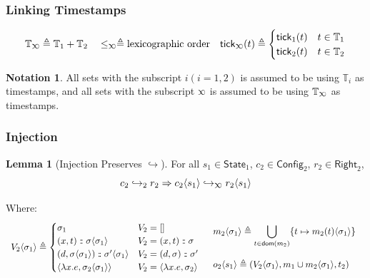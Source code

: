 \documentclass{beamer}
\theoremstyle{definition}
\newtheorem*{lemma*}{Lemma}
\newtheorem*{notation*}{Notation}
\newcommand*{\cons}{:{\hspace{-0.7em}}:}
\newcommand*{\modid}{d}
\newcommand*{\Time}{\mathbb{T}}
\newcommand*{\ctx}{\sigma}
\newcommand*{\mem}{m}
\newcommand*{\Config}{\mathsf{Config}}
\newcommand*{\config}{c}
\newcommand*{\Right}{\mathsf{Right}}
\newcommand*{\rightst}{r}
\newcommand*{\State}{\mathsf{State}}
\newcommand*{\semarrow}{\hookrightarrow}
\newcommand*{\semlink}{\mathbin{\rotatebox[origin=c]{180}{$\propto$}}}
\newcommand*{\tick}{\mathsf{tick}}
\newcommand*{\inject}[2]{{#2}\langle{#1}\rangle}
\begin{document}
\begin{frame}[c]
  \frametitle{Linking Timestamps}
  \[
    \Time_{\semlink}\triangleq\Time_1+\Time_2\quad
    \le_{\semlink}\triangleq\text{lexicographic order}\quad
    \tick_{\semlink}(t)\triangleq
    \begin{cases}
      \tick_1(t) & t\in\Time_1 \\
      \tick_2(t) & t\in\Time_2
    \end{cases}
  \]

  \begin{notation*}
    All sets with the subscript $i(i=1,2)$ is assumed to be using $\Time_i$ as timestamps, and all sets with the subscript $\semlink$ is assumed to be using $\Time_{\semlink}$ as timestamps.
  \end{notation*}
\end{frame}
\begin{frame}[c]
  \frametitle{Injection}
  \begin{lemma*}[Injection Preserves $\semarrow$]
    For all $s_1\in\State_1$, $\config_2\in\Config_2$, $\rightst_2\in\Right_2$,
    \[\config_2\semarrow_2\rightst_2\Rightarrow\inject{s_1}{\config_2}\semarrow_{\semlink}\inject{s_1}{\rightst_2}\]
  \end{lemma*}

  Where:
    {\footnotesize
      \[
        \begin{array}{cc}
          \inject{\ctx_{1}}{V_{2}}\triangleq
          \begin{cases}
            \ctx_1                                                         & V_{2}=[]                               \\
            (x, t)\cons\inject{\ctx_{1}}{\ctx}                             & V_{2}=(x,t)\cons \ctx                  \\
            (\modid, \inject{\ctx_{1}}{\ctx})\cons\inject{\ctx_{1}}{\ctx'} & V_{2}=(\modid,\ctx)\cons \ctx'         \\
            \langle\lambda x.e,\inject{\ctx_1}{\ctx_2}\rangle              & V_{2}=\langle\lambda x.e,\ctx_2\rangle
          \end{cases} &
          \begin{array}{l}
            \inject{\ctx_1}{\mem_2}\triangleq
            \displaystyle\bigcup_{t\in\mathsf{dom}(\mem_2)}\{t\mapsto\inject{\ctx_1}{\mem_2(t)}\} \\ \\
            \inject{s_1}{o_2}\triangleq
            (\inject{\ctx_1}{V_2},\mem_1\cup\inject{\ctx_1}{\mem_2},t_2)
          \end{array}
        \end{array}
      \]}%
\end{frame}
\end{document}
